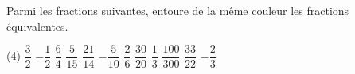 %
%
Parmi les fractions suivantes, entoure de la même couleur les fractions équivalentes.
  \begin{tasks}(4)
    \task  $\dfrac{3}{2}$
    \task $- \dfrac{1}{2}$
    \task $\dfrac{6}{4}$
    \task $\dfrac{5}{15}$
    \task $\dfrac{21}{14}$
    \task $- \dfrac{5}{10}$
    \task $\dfrac{2}{6}$
    \task $\dfrac{30}{20}$
    \task $\dfrac{1}{3}$
    \task $\dfrac{100}{300}$
    \task $\dfrac{33}{22}$
    \task $- \dfrac{2}{3}$
  \end{tasks}
